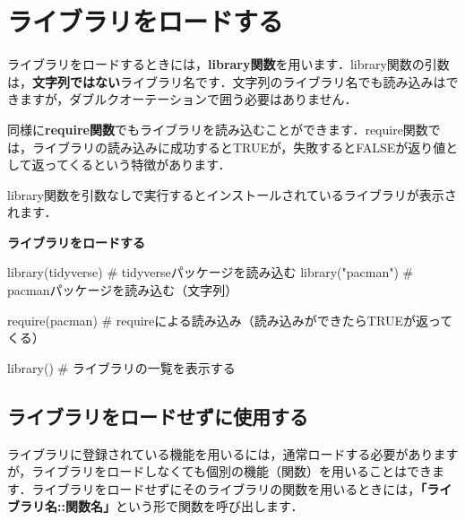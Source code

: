 \documentclass[
  letterpaper,
  DIV=11,
  numbers=noendperiod]{scrreprt}
\newenvironment{Shaded}{\begin{snugshade}}{\end{snugshade}}
\newcommand{\CommentTok}[1]{\textcolor[rgb]{0.37,0.37,0.37}{#1}}
\newcommand{\FunctionTok}[1]{\textcolor[rgb]{0.28,0.35,0.67}{#1}}
\newcommand{\NormalTok}[1]{\textcolor[rgb]{0.00,0.23,0.31}{#1}}
\newcommand{\StringTok}[1]{\textcolor[rgb]{0.13,0.47,0.30}{#1}}
\begin{document}
\hypertarget{ux30e9ux30a4ux30d6ux30e9ux30eaux3092ux30edux30fcux30c9ux3059ux308b}{%
\section{ライブラリをロードする}\label{ux30e9ux30a4ux30d6ux30e9ux30eaux3092ux30edux30fcux30c9ux3059ux308b}}

ライブラリをロードするときには，\textbf{library関数}を用います．library関数の引数は，\textbf{文字列ではない}ライブラリ名です．文字列のライブラリ名でも読み込みはできますが，ダブルクオーテーションで囲う必要はありません．

同様に\textbf{require関数}でもライブラリを読み込むことができます．require関数では，ライブラリの読み込みに成功するとTRUEが，失敗するとFALSEが返り値として返ってくるという特徴があります．

library関数を引数なしで実行するとインストールされているライブラリが表示されます．

\textbf{ライブラリをロードする}

\begin{Shaded}
\begin{Highlighting}[]
\FunctionTok{library}\NormalTok{(tidyverse) }\CommentTok{\# tidyverseパッケージを読み込む}
\FunctionTok{library}\NormalTok{(}\StringTok{"pacman"}\NormalTok{) }\CommentTok{\# pacmanパッケージを読み込む（文字列）}

\FunctionTok{require}\NormalTok{(pacman) }\CommentTok{\# requireによる読み込み（読み込みができたらTRUEが返ってくる）}

\FunctionTok{library}\NormalTok{() }\CommentTok{\# ライブラリの一覧を表示する}
\end{Highlighting}
\end{Shaded}

\hypertarget{ux30e9ux30a4ux30d6ux30e9ux30eaux3092ux30edux30fcux30c9ux305bux305aux306bux4f7fux7528ux3059ux308b}{%
\subsection{ライブラリをロードせずに使用する}\label{ux30e9ux30a4ux30d6ux30e9ux30eaux3092ux30edux30fcux30c9ux305bux305aux306bux4f7fux7528ux3059ux308b}}

ライブラリに登録されている機能を用いるには，通常ロードする必要がありますが，ライブラリをロードしなくても個別の機能（関数）を用いることはできます．ライブラリをロードせずにそのライブラリの関数を用いるときには，\textbf{「ライブラリ名::関数名」}という形で関数を呼び出します．
\end{document}
